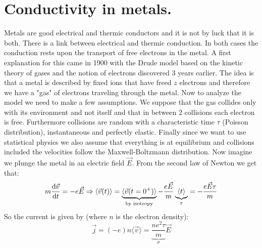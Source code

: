 \documentclass[10pt,a4paper]{book}
\begin{document}
\section{Conductivity in metals.}
Metals are good electrical and thermic conductors and it is not by luck that it is both. There is a link between electrical and thermic conduction. In both cases the conduction rests upon the transport of free electrons in the metal. A first explanation for this came in 1900 with the Drude model based on the kinetic theory of gases and the notion of electrons discovered 3 years earlier. The idea is that a metal is described by fixed ions that have freed $z$ electrons and therefore we have a "gas" of electrons traveling through the metal. Now to analyze the model we need to make a few assumptions. We suppose that the gas collides only with its environment and not itself and that in between 2 collisions each electron is free. Furthermore collisions are random with a characteristic time $\tau$ (Poisson distribution), instantaneous and perfectly elastic. Finally since we want to use statistical physics we also assume that everything is at equilibrium and collisions included the velocities follow the Maxwell-Boltzmann distribution. Now imagine we plunge the metal in an electric field $\vec{E}$. From the second law of Newton we get that:
\[
m \dv{\vec{v}}{t} = - e \vec{E} \Rightarrow \langle \vec{v}(t) \rangle = \underbrace{\langle \vec{v}(t = 0^+)\rangle}_\text{by isotropy} - \frac{e \vec{E}}{m} \underbrace{\langle t \rangle}_{\tau} = - \frac{e \vec{E} \tau}{m}
\]
So the current is given by (where $n$ is the electron density):
\[
\vec{j} = (-e) n \langle \vec{v} \rangle = \underbrace{\frac{n e^2 \tau}{m}}_{\sigma} \vec{E}
\]
\end{document}
